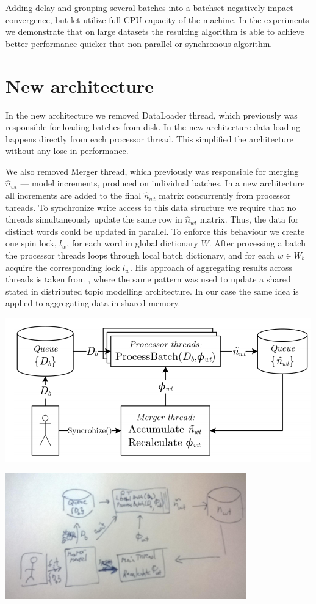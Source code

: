 \documentclass[russian,english]{llncs}
\begin{document}
Adding delay and grouping several batches into a batchset negatively impact convergence,
but let utilize full CPU capacity of the machine.
In the experiments we demonstrate that on large datasets the resulting algorithm
is able to achieve better performance quicker that non-parallel or synchronous algorithm.

\section{New architecture}
\label{sec:Architecture}

In the new architecture we removed DataLoader thread,
which previously was responsible for loading batches from disk.
In the new architecture data loading happens directly from each processor thread.
This simplified the architecture without any lose in performance.

We also removed Merger thread, which previously was responsible
for merging $\hat n_{wt}$ --- model increments, produced on individual batches.
In a new architecture all increments are added to the final $\hat n_{wt}$ matrix
concurrently from processor threads.
To synchronize write access to this data structure we require that
no threads simultaneously update the same row in $\hat n_{wt}$ matrix.
Thus, the data for distinct words could be updated in parallel.
To enforce this behaviour we create one spin lock, $l_w$, for each word in global dictionary $W$.
After processing a batch the processor threads loops through local batch dictionary,
and for each $w \in W_b$ acquire the corresponding lock $l_w$.
His approach of aggregating results across threads is taken from \cite{smola10architecture},
where the same pattern was used to update a shared stated in distributed topic modelling architecture.
In our case the same idea is applied to aggregating data in shared memory.

\includegraphics[natwidth=501bp,natheight=235bp,width=270bp]{old_arch.png}

\includegraphics[natwidth=394bp,natheight=206bp,width=270bp]{new_arch.png}
\end{document}
